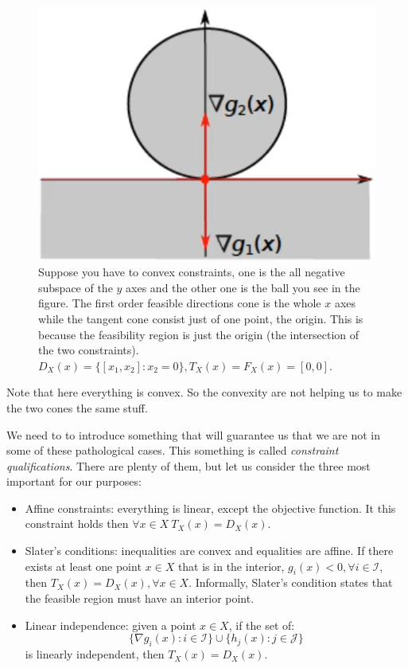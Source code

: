 \begin{figure}
    \centering
    \includegraphics[scale=0.6]{figures/3/chapter3-feasible_cone_larger.png}
    \caption{Suppose you have to convex constraints, one is the all negative subspace of the $y$ axes and the other one is the ball you see in the figure. The first order feasible directions cone is the whole $x$ axes while the tangent cone consist just of one point, the origin. This is because the feasibility region is just the origin (the intersection of the two constraints). $D_X(x) = \{[x_1,x_2] : x_2 = 0\}, T_X(x) = F_X(x) = [0,0]$.}
    \label{fig:chapter3-feasible_cone_larger}
\end{figure}
Note that here everything is convex. So the convexity are not helping us to make the two cones the same stuff.
\par We need to to introduce something that will guarantee us that we are not in some of these pathological cases. This something is called \textit{constraint qualifications}. There are plenty of them, but let us consider the three most important for our purposes:
\begin{itemize}
    \item Affine constraints: everything is linear, except the objective function. It this constraint holds then $\forall x \in X\ T_X(x) = D_X(x)$.
    \item Slater's conditions: inequalities are convex and equalities are affine. If there exists at least one point $x \in X$ that is in the interior, $g_i(x) < 0, \forall i \in \mathcal{I}$, then $T_X(x) = D_X(x), \forall x \in X$. Informally, Slater's condition states that the feasible region must have an interior point.
    \item Linear independence: given a point $x \in X$, if the set of:
    \[
        \{\nabla g_i(x) : i \in \mathcal{I}\} \cup \{h_j(x) : j \in \mathcal{J}\}
    \]
    is linearly independent, then $T_X(x) = D_X(x)$.
\end{itemize}
